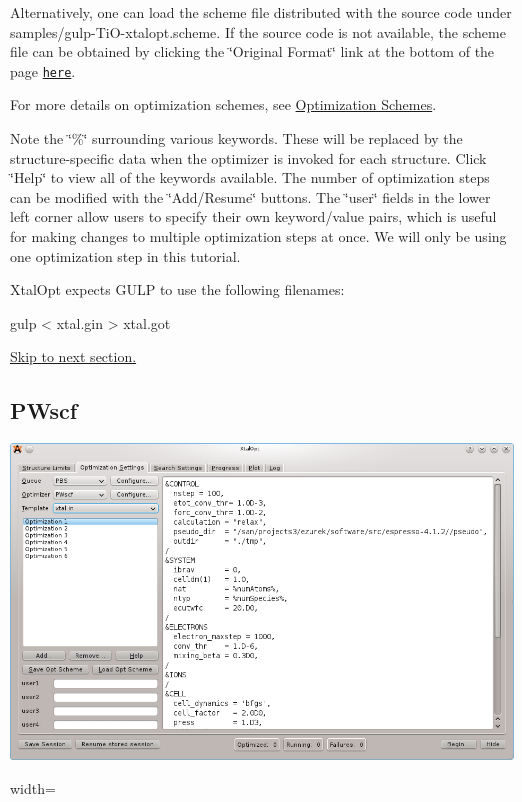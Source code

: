 Alternatively, one can load the scheme file distributed with the source code under samples/gulp-\/\-Ti\-O-\/xtalopt.\-scheme. If the source code is not available, the scheme file can be obtained by clicking the \char`\"{}\-Original Format\char`\"{} link at the bottom of the page \href{http://xtalopt.openmolecules.net/wiki/index.fcgi/browser/samples/gulp-TiO-xtalopt.scheme}{\tt here}.

For more details on optimization schemes, see \hyperlink{optschemes}{Optimization Schemes}.

Note the \char`\"{}\%\char`\"{} surrounding various keywords. These will be replaced by the structure-\/specific data when the optimizer is invoked for each structure. Click \char`\"{}\-Help\char`\"{} to view all of the keywords available. The number of optimization steps can be modified with the \char`\"{}\-Add/\-Resume\char`\"{} buttons. The \char`\"{}user\char`\"{} fields in the lower left corner allow users to specify their own keyword/value pairs, which is useful for making changes to multiple optimization steps at once. We will only be using one optimization step in this tutorial.

Xtal\-Opt expects G\-U\-L\-P to use the following filenames\-:


\begin{DoxyCode}
gulp < xtal.gin > xtal.got
\end{DoxyCode}


\hyperlink{tut-xo_qisetup}{Skip to next section.}\hypertarget{tut-xo_pwscf-opt}{}\subsection{P\-Wscf}\label{tut-xo_pwscf-opt}
 
\begin{DoxyImage}
\includegraphics{opt-set-pwscf.png}
\caption{width=}
\end{DoxyImage}


